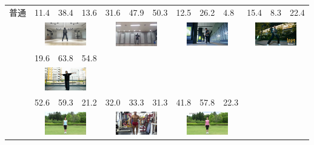 \begin{table}[t]
\begin{center}
\begin{tabular}{|c|p{5mm}p{5mm}p{5mm}|p{5mm}p{5mm}p{5mm}|p{5mm}p{5mm}p{5mm}|p{5mm}p{5mm}p{5mm}|}
      \\ \cline{2-13}
      普通
        &11.4 &38.4 &13.6 &31.6 &47.9 &50.3 &12.5 &26.2 &4.8 &15.4 &8.3 &22.4 \\
        & \multicolumn{3}{|c|}{\includegraphics[width=18mm]{images/snaps/bts_dance.png}}
        & \multicolumn{3}{|c|}{\includegraphics[width=18mm]{images/snaps/manolo_dance.png}}
        & \multicolumn{3}{|c|}{\includegraphics[width=18mm]{images/snaps/hyoga_dance.png}}
        & \multicolumn{3}{|c|}{\includegraphics[width=18mm]{images/snaps/legit_dance.png}}
      \\ \cline{2-13}
        &19.6 &63.8 &54.8 & & & & & & & & & \\
        & \multicolumn{3}{|c|}{\includegraphics[width=18mm]{images/snaps/aito_dance.png}}
        & \multicolumn{3}{|c|}{}
        & \multicolumn{3}{|c|}{}
        & \multicolumn{3}{|c|}{}
      \\ \hline
        &52.6 &59.3 &21.2 &32.0 &33.3 &31.3 &41.8 &57.8 &22.3 & & & \\
        & \multicolumn{3}{|c|}{\includegraphics[width=18mm]{images/snaps/radio_exer.png}}
        & \multicolumn{3}{|c|}{\includegraphics[width=18mm]{images/snaps/posing.png}}
        & \multicolumn{3}{|c|}{\includegraphics[width=18mm]{images/snaps/radio_exer_2.png}}

\end{tabular}
\end{center}
\end{table}
